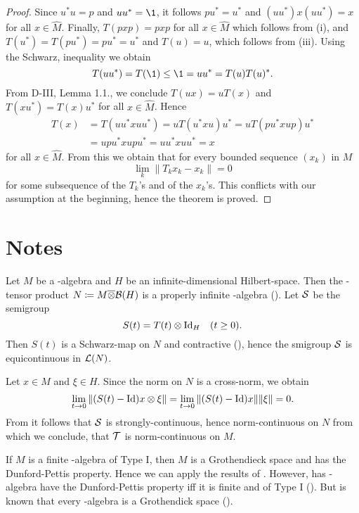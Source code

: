 \begin{proof}
Since $u^{*}u = p$ and $uu^{*} = \1$, it follows $pu^{*} = u^{*}$ and $(uu^{*})x(uu^{*}) = x$ for all $x \in \widehat{M}$.
Finally, $T(pxp) = pxp$ for all $x \in \widehat{M}$ which follows from (i), and $T(u^{*}) = T(pu^{*}) = pu^{*} = u^{*}$ and $T(u) = u$, which follows from (iii).
Using the Schwarz, inequality we obtain
\[
	T(uu^{*}) = T(\1) \leq \1 = uu^{*} = T(u)T(u)^{*}.
\]
From D-III, Lemma 1.1., we conclude $T(ux) = uT(x)$ and $T(xu^{*}) = T(x)u^{*}$ for all $x \in \widehat{M}$.
Hence
\begin{align*}
T(x) &= T(uu^{*}xuu^{*}) = uT(u^{*}xu)u^{*} = uT(pu^{*}xup)u^{*} \\
&= upu^{*}xupu^{*} = uu^{*}xuu^{*} = x
\end{align*}
for all $x \in \widehat{M}$.
From this we obtain that for every bounded sequence $(x_{k})$ in $M$
\[
	\lim_k \|T_k x_{k} - x_{k}\| = 0
\]
for some subsequence of the $T_{k}$'s and of the $x_{k}$'s.
This conflicts with our assumption at the beginning, hence the theorem is proved.
\end{proof}

\section*{Notes}
Let $ M $ be a \WA-algebra and $ H $ be an infinite-dimensional Hilbert-space. 
Then the \WA-tensor product $ N \coloneq M \overline{\otimes} \mathcal{B}(H) $ is a properly infinite \WA-algebra (\citet[Thm. 2.6.6]{sakai:1971}).
Let $ \mathcal{S} $ be the semigroup 
%
\[
	S(t) = T(t) \otimes \operatorname{Id}_{H} \quad (t \geq 0). 
\]
%
Then $ S(t) $ is a Schwarz-map on $ N $ and contractive (\citet[Prop. IV.5.13.]{takesaki:1979}), hence the smigroup $ \mathcal{S} $ is equicontinuous in $ \mathcal{L}(N) $.

Let $ x \in M $ and $  \xi \in H$.
Since the norm on $ N $ is a cross-norm, we obtain
%
\[
	\lim_{t \to 0} \| ( S(t) - \operatorname{Id} ) x \otimes \xi \| =
	\lim_{t \to 0} \| ( S(t) - \operatorname{Id} ) x \| \| \xi \| = 0.
\]
%
From \citet[III.4.5]{schaefer:1966} it follows that $ \mathcal{S} $ is strongly-continuous, hence norm-continuous on $ N $ from which we conclude, that $ \mathcal{T} $ is norm-continuous on $ M $.
\begin{remark}
If $ M $ is a finite \WA-algebra of Type I, then $ M $ is a Grothendieck space and has the Dunford-Pettis property. 
Hence we can apply the results of \citet{lotz:1985}.
However, has \WA-algebra have the Dunford-Pettis property iff it is finite and of Type I (\citet{chu:1990}).
But is known that every \WA-algebra is a Grothendick space (\citet{pfitzner:1994}).
\end{remark}

{\RaggedRight

}
